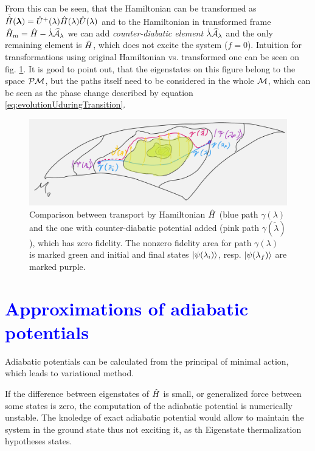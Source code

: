 From this can be seen, that the Hamiltonian can be transformed as $\tilde\HH(\llambda)=\U^+(\lambda)\HH(\lambda)\U(\lambda)$ and to the Hamiltonian in transformed frame $\HH_m = \HH-\dot{\lambda}\AA_\lambda$ we can add \emph{counter-diabatic element} $\dot{\lambda}\AA_\lambda$ and the only remaining element is $\HH$, which does not excite the system ($f=0$). Intuition for transformations using original Hamiltonian vs. transformed one can be seen on fig. \ref{fig:counterdiabaticPotential}. It is good to point out, that the eigenstates on this figure belong to the space $\P\M$, but the paths itself need to be considered in the whole $\M$, which can be seen as the phase change described by equation \ref{eq:evolutionUduringTransition}.

\begin{figure}[h]
    \centering
    \includegraphics[width=\textwidth]{../img/counterdiabaticPotential.png}
    \caption{Comparison between transport by Hamiltonian $\HH$ (blue path $\gamma(\lambda)$ and the one with counter-diabatic potential added (pink path $\gamma(\tilde\lambda)$), which has zero fidelity. The nonzero fidelity area for path $\gamma(\lambda)$ is marked green and initial and final states $\ket{\psi(\lambda_i)}$, resp. $\ket{\psi(\lambda_f)}$ are marked purple.}
    \label{fig:counterdiabaticPotential}
\end{figure}



\section{\textcolor{blue}{Approximations of adiabatic potentials}}
Adiabatic potentials can be calculated from the principal of minimal action, which leads to variational method.

If the difference between eigenstates of $\HH$ is small, or generalized force between some states is zero, the computation of the adiabatic potential is numerically unstable. The knoledge of exact adiabatic potential would allow to maintain the system in the ground state thus not exciting it, as th Eigenstate thermalization hypotheses states.

